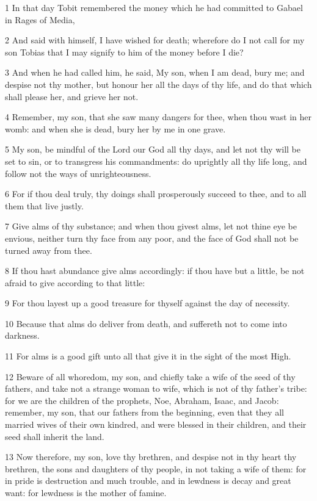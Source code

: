 \par 1 In that day Tobit remembered the money which he had committed to Gabael in Rages of Media,
\par 2 And said with himself, I have wished for death; wherefore do I not call for my son Tobias that I may signify to him of the money before I die?
\par 3 And when he had called him, he said, My son, when I am dead, bury me; and despise not thy mother, but honour her all the days of thy life, and do that which shall please her, and grieve her not.
\par 4 Remember, my son, that she saw many dangers for thee, when thou wast in her womb: and when she is dead, bury her by me in one grave.
\par 5 My son, be mindful of the Lord our God all thy days, and let not thy will be set to sin, or to transgress his commandments: do uprightly all thy life long, and follow not the ways of unrighteousness.
\par 6 For if thou deal truly, thy doings shall prosperously succeed to thee, and to all them that live justly.
\par 7 Give alms of thy substance; and when thou givest alms, let not thine eye be envious, neither turn thy face from any poor, and the face of God shall not be turned away from thee.
\par 8 If thou hast abundance give alms accordingly: if thou have but a little, be not afraid to give according to that little:
\par 9 For thou layest up a good treasure for thyself against the day of necessity.
\par 10 Because that alms do deliver from death, and suffereth not to come into darkness.
\par 11 For alms is a good gift unto all that give it in the sight of the most High.
\par 12 Beware of all whoredom, my son, and chiefly take a wife of the seed of thy fathers, and take not a strange woman to wife, which is not of thy father's tribe: for we are the children of the prophets, Noe, Abraham, Isaac, and Jacob: remember, my son, that our fathers from the beginning, even that they all married wives of their own kindred, and were blessed in their children, and their seed shall inherit the land.
\par 13 Now therefore, my son, love thy brethren, and despise not in thy heart thy brethren, the sons and daughters of thy people, in not taking a wife of them: for in pride is destruction and much trouble, and in lewdness is decay and great want: for lewdness is the mother of famine.

